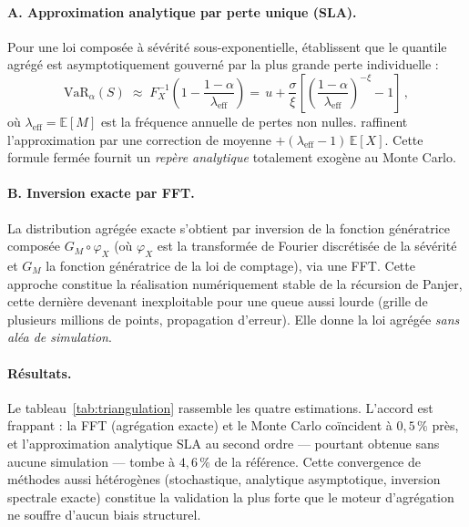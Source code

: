 \documentclass[11pt,a4paper]{article}
\theoremstyle{navystyle}
\theoremstyle{navydef}
\newcommand{\E}{\mathbb{E}}
\newcommand{\VaR}{\mathrm{VaR}}
\begin{document}
\paragraph{A. Approximation analytique par perte unique (SLA).} Pour une loi composée à sévérité sous-exponentielle, \citet{bockerkluppelberg2005} établissent que le quantile agrégé est asymptotiquement gouverné par la plus grande perte individuelle :
\begin{equation}
\VaR_\alpha(S)\;\approx\;F_X^{-1}\!\left(1-\frac{1-\alpha}{\lambda_{\text{eff}}}\right)
= \boxed{\,u+\frac{\sigma}{\xi}\left[\left(\frac{1-\alpha}{\lambda_{\text{eff}}}\right)^{-\xi}-1\right]\,},
\label{eq:sla}
\end{equation}
où $\lambda_{\text{eff}}=\E[M]$ est la fréquence annuelle de pertes non nulles. \citet{bockersprittulla2006} raffinent l'approximation par une correction de moyenne $+(\lambda_{\text{eff}}-1)\,\E[X]$. Cette formule fermée fournit un \emph{repère analytique} totalement exogène au Monte Carlo.

\paragraph{B. Inversion exacte par FFT.} La distribution agrégée exacte s'obtient par inversion de la fonction génératrice composée $G_M\!\circ\varphi_X$ (où $\varphi_X$ est la transformée de Fourier discrétisée de la sévérité et $G_M$ la fonction génératrice de la loi de comptage), via une FFT. Cette approche constitue la réalisation numériquement stable de la récursion de Panjer, cette dernière devenant inexploitable pour une queue aussi lourde (grille de plusieurs millions de points, propagation d'erreur). Elle donne la loi agrégée \emph{sans aléa de simulation}.

\paragraph{Résultats.} Le tableau~\ref{tab:triangulation} rassemble les quatre estimations. L'accord est frappant : la FFT (agrégation exacte) et le Monte Carlo coïncident à $0{,}5\,\%$ près, et l'approximation analytique SLA au second ordre --- pourtant obtenue sans aucune simulation --- tombe à $4{,}6\,\%$ de la référence. Cette convergence de méthodes aussi hétérogènes (stochastique, analytique asymptotique, inversion spectrale exacte) constitue la validation la plus forte que le moteur d'agrégation ne souffre d'aucun biais structurel.
\end{document}
